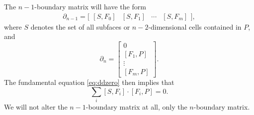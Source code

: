 \documentclass[twocolumn]{article}
\begin{document}
The $n - 1$-boundary matrix will have the form
\begin{equation}
    \partial_{n - 1} = \Big[\begin{matrix}[S, F_0] & [S, F_1] & \cdots & [S, F_m]\end{matrix}\Big],
\end{equation}
where $S$ denotes the set of all subfaces or $n - 2$-dimensional cells contained in $P$, and
\begin{equation}
    \partial_n = \left[\begin{matrix} 0 \\ [F_1, P] \\ \vdots \\ [F_m, P]\end{matrix}\right].
\end{equation}
The fundamental equation \eqref{eq:ddzero} then implies that
\begin{equation}
    \sum_i[S, F_i]\cdot[F_i, P] = 0.
    \label{eq:face-split-ddzero}
\end{equation}
We will not alter the $n - 1$-boundary matrix at all, only the $n$-boundary matrix.
\end{document}
